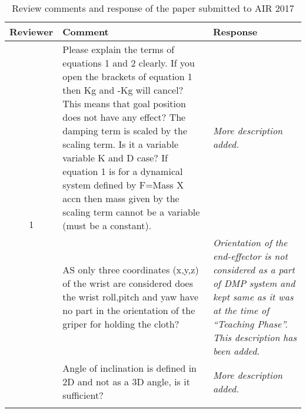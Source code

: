 \documentclass{article}
\begin{document}
\begin{table}
	\centering
	\caption{Review comments and response of the paper submitted to AIR 2017}
	\begin{tabular}{ |c|p{9cm}|p{5cm}| }
		\hline
		\textbf{Reviewer}  & \textbf{Comment}                                                                                                                                                                                                                                                                                                                                                                                                           & \textbf{Response}                                                                                                                           \\ \hline\hline
		\multirow{4}{*}{1} & Please explain the terms of equations 1 and 2 clearly. If you open the brackets of equation 1 then Kg and -Kg will cancel? This means that goal position does not have any effect? The damping term is scaled by the scaling term. Is it a variable variable K and D case? If equation 1 is for a dynamical system defined by F=Mass X accn then mass given by the scaling term cannot be a variable (must be a constant). & \textit{More description added.}                                                                                                            \\ \cline{2-3}
		                   & AS only three coordinates (x,y,z) of the wrist are considered does the wrist roll,pitch and yaw have no part in the orientation of the griper for holding the cloth?                                                                                                                                                                                                                                                       & \textit{Orientation of the end-effector is not considered as a part of DMP system and                                                       
		kept same as it was at the time of ``Teaching Phase''. This description has been added.}  \\ \cline{2-3}
		                   & Angle of inclination is defined in 2D and not as a 3D angle, is it sufficient?                                                                                                                                                                                                                                                                                                                                             & \textit{More description added.}                                                                                                            \\ \cline{2-3}

\end{tabular}
\end{table}
\end{document}
